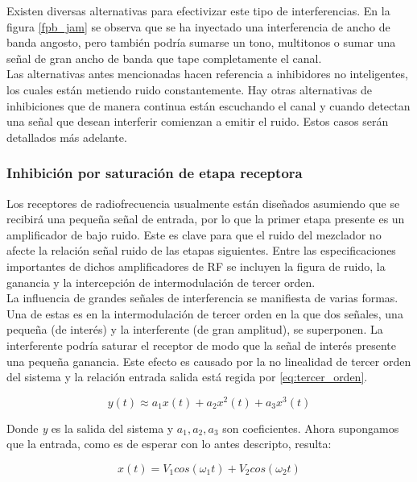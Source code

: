 \documentclass[12pt]{report}
\begin{document}
Existen diversas alternativas para efectivizar este tipo de interferencias. En la figura \ref{fpb_jam} se observa que se ha inyectado una
interferencia de ancho de banda angosto, pero también podría sumarse un tono, multitonos o sumar una señal de gran ancho de banda que 
tape completamente el canal. \\
Las alternativas antes mencionadas hacen referencia a inhibidores no inteligentes, los cuales están metiendo ruido constantemente. Hay otras 
alternativas de inhibiciones que de manera continua están escuchando el canal y cuando detectan una señal que 
desean interferir comienzan a emitir el ruido. Estos casos serán detallados más adelante.

\subsubsection{Inhibición por saturación de etapa receptora}

Los receptores de radiofrecuencia usualmente están diseñados asumiendo que se recibirá una pequeña señal de entrada, por lo que la primer
etapa presente es un amplificador de bajo ruido.  Este es clave para que el ruido del mezclador no afecte la relación señal ruido de las 
etapas siguientes. Entre las especificaciones importantes de dichos amplificadores de RF se incluyen la figura de ruido, la ganancia y la 
intercepción de intermodulación de tercer orden.\\ \todo[inline, inlinewidth=4cm, noinlinepar]{[6]-[7]}
La influencia de grandes señales de interferencia se manifiesta de varias formas. Una de estas es en la intermodulación de tercer orden en 
la que dos señales, una pequeña (de interés) y la interferente (de gran amplitud), se superponen. La interferente podría saturar el receptor
de modo que la señal de interés presente una pequeña ganancia. Este efecto es causado por la no linealidad de tercer orden del sistema y la relación
entrada salida está regida por \ref{eq:tercer_orden}.

\begin{equation}\label{eq:tercer_orden}
    y(t) \approx  a_1 x(t) + a_2 x^{2}(t) + a_3 x^{3}(t) 
\end{equation}

Donde \emph{y} es la salida del sistema y \(a_1, a_2, a_3 \) son coeficientes. Ahora supongamos que la entrada, como es de esperar con lo antes
descripto, resulta:

\begin{equation}\label{eq:entrada}
    x(t)=V_1 cos(\omega_1 t)+ V_2 cos(\omega_2 t)
\end{equation}
\end{document}

